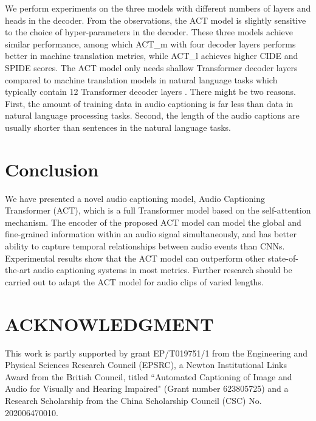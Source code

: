 \documentclass{article}
\begin{document}
\begin{sloppy}
We perform experiments on the three models with different numbers of layers and heads in the decoder. From the observations, the ACT model is slightly sensitive to the choice of hyper-parameters in the decoder. These three models achieve similar performance, among which ACT\_m with four decoder layers performs better in machine translation metrics, while ACT\_l achieves higher CIDE and SPIDE scores. The ACT model only needs shallow Transformer decoder layers compared to machine translation models in natural language tasks which typically contain \num{12} Transformer decoder layers \cite{vaswani2017attention}. There might be two reasons. First, the amount of training data in audio captioning is far less than data in natural language processing tasks. Second, the length of the audio captions are usually shorter than sentences in the natural language tasks.
\section{Conclusion}
\label{sec:conclusion}
We have presented a novel audio captioning model, Audio Captioning Transformer (ACT), which is a full Transformer model based on the self-attention mechanism. The encoder of the proposed ACT model can model the global and fine-grained information within an audio signal simultaneously, and has better ability to capture temporal relationships between audio events than CNNs. Experimental results show that the ACT model can outperform other state-of-the-art audio captioning systems in most metrics. Further research should be carried out to adapt the ACT model for audio clips of varied lengths.

\section{ACKNOWLEDGMENT}
\label{sec:ackn}
This work is partly supported by grant EP/T019751/1 from the Engineering and Physical Sciences Research Council (EPSRC), a Newton Institutional Links Award from the British Council, titled ``Automated Captioning of Image and Audio for Visually and Hearing Impaired" (Grant number 623805725) and a Research Scholarship from the China Scholarship Council (CSC) No. 202006470010. 




\end{sloppy}
\end{document}
